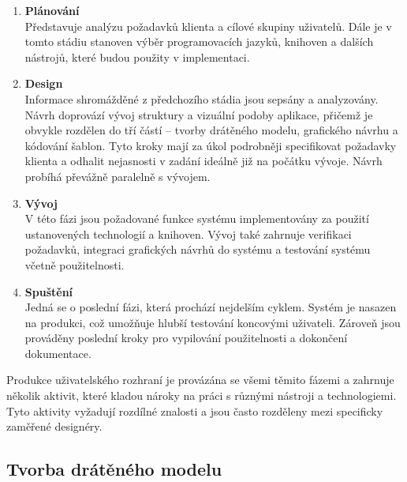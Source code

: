 \begin{enumerate}[leftmargin=1cm]
    \item \textbf{Plánování}\\
          Představuje analýzu požadavků klienta a cílové skupiny uživatelů. Dále je v tomto stádiu stanoven výběr programovacích jazyků, knihoven a dalších nástrojů, které budou použity v implementaci.

    \item \textbf{Design}\\
          Informace shromážděné z předchozího stádia jsou sepsány a analyzovány. Návrh doprovází vývoj struktury a vizuální podoby aplikace, přičemž je obvykle rozdělen do tří částí -- tvorby drátěného modelu, grafického návrhu a kódování šablon. Tyto kroky mají za úkol podrobněji specifikovat požadavky klienta a odhalit nejasnosti v zadání ideálně již na počátku vývoje. Návrh probíhá převážně paralelně s vývojem.

    \item \textbf{Vývoj}\\
          V této fázi jsou požadované funkce systému implementovány za použití ustanovených technologií a knihoven. Vývoj také zahrnuje verifikaci požadavků, integraci grafických návrhů do systému a testování systému včetně použitelnosti.

    \item \textbf{Spuštění}\\
          Jedná se o poslední fázi, která prochází nejdelším cyklem. Systém je nasazen na produkci, což umožňuje hlubší testování koncovými uživateli. Zároveň jsou prováděny poslední kroky pro vypilování použitelnosti a dokončení dokumentace.

\end{enumerate}

Produkce uživatelského rozhraní je provázána se všemi těmito fázemi a zahrnuje několik aktivit, které kladou nároky na práci s různými nástroji a technologiemi. Tyto aktivity vyžadují rozdílné znalosti a jsou často rozděleny mezi specificky zaměřené designéry. \cite{5}

\subsection{Tvorba drátěného modelu}
\label{sec:wireframing}

